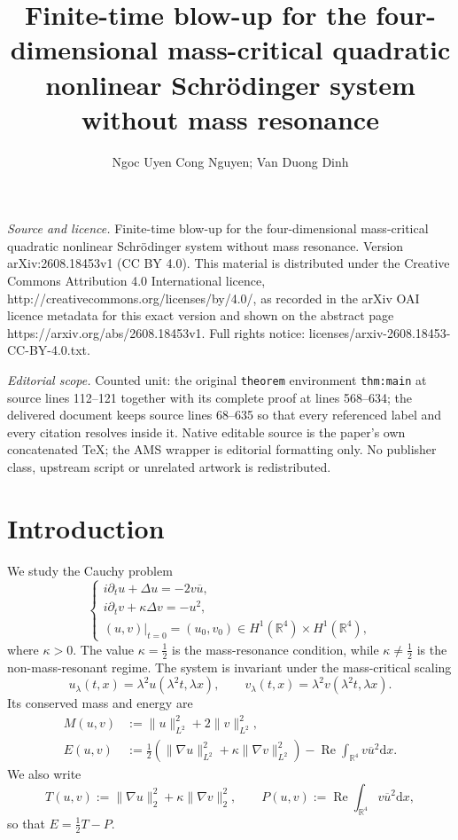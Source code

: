 \documentclass[10pt,a4paper]{amsart}
\numberwithin{equation}{section}
\newcommand{\R}{\mathbb{R}}
\newcommand{\dd}{\mathrm{d}x}
\newcommand{\re}{\operatorname{Re}}
\begin{document}
\title[Finite-time blow-up for the four-dimensional mass-critical q]{Finite-time blow-up for the four-dimensional mass-critical quadratic nonlinear Schr\"odinger system without mass resonance}
\author{Ngoc Uyen Cong Nguyen; Van Duong Dinh}
\date{}
\maketitle
\noindent\emph{Source and licence.} Finite-time blow-up for the four-dimensional mass-critical quadratic nonlinear Schr\"odinger system without mass resonance. Version arXiv:2608.18453v1 (CC BY 4.0). This material is distributed under the Creative Commons Attribution 4.0 International licence, http://creativecommons.org/licenses/by/4.0/, as recorded in the arXiv OAI licence metadata for this exact version and shown on the abstract page https://arxiv.org/abs/2608.18453v1. Full rights notice: licenses/arxiv-2608.18453-CC-BY-4.0.txt.\par\smallskip
\noindent\textit{Editorial scope.} Counted unit: the original \texttt{theorem} environment \texttt{thm:main} at source lines 112--121 together with its complete proof at lines 568--634; the delivered document keeps source lines 68--635 so that every referenced label and every citation resolves inside it. Native editable source is the paper's own concatenated TeX; the AMS wrapper is editorial formatting only. No publisher class, upstream script or unrelated artwork is redistributed.
\section{Introduction}
\setcounter{equation}{0}
We study the Cauchy problem
\begin{equation}\label{eq:system}
\begin{cases}
 i\partial_t u+\Delta u=-2v\overline{u},\\
 i\partial_t v+\kappa\Delta v=-u^2,\\
 (u,v)|_{t=0}=(u_0,v_0)\in H^1(\R^4)\times H^1(\R^4),
\end{cases}
\end{equation}
where $\kappa>0$.  The value $\kappa=\frac12$ is the mass-resonance condition, while $\kappa\neq\frac12$ is the non-mass-resonant regime.  The system is invariant under the mass-critical scaling
\begin{equation*}
 u_\lambda(t,x)=\lambda^2u(\lambda^2t,\lambda x), \qquad v_\lambda(t,x)=\lambda^2v(\lambda^2t,\lambda x).
\end{equation*}
Its conserved mass and energy are
\begin{align}
 M(u,v)&:=\|u\|_{L^2}^2+2\|v\|_{L^2}^2,\tag{mass}\\
 E(u,v)&:=\frac12\left(\|\nabla u\|_{L^2}^2+\kappa\|\nabla v\|_{L^2}^2\right)
 -\re\int_{\R^4}v\overline{u}^{2}\dd.\tag{energy}
\end{align}
We also write
\begin{equation*}
 T(u,v):=\|\nabla u\|_2^2+\kappa\|\nabla v\|_2^2, \qquad P(u,v):=\re\int_{\R^4}v\overline{u}^{2}\dd,
\end{equation*}
so that $E=\frac12T-P$.
\end{document}
